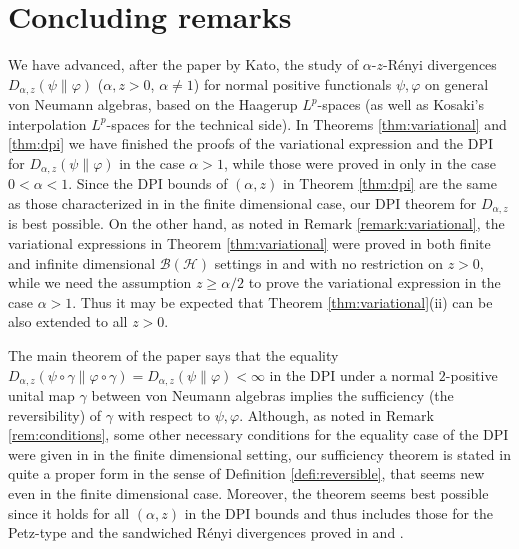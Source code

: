 \documentclass[12pt]{article}
\theoremstyle{definition}
\theoremstyle{remark}
\numberwithin{equation}{section}
\def\ffi{\varphi}
\begin{document}
\section{Concluding remarks}

We have advanced, after the paper \cite{kato2023onrenyi} by Kato, the study of $\alpha$-$z$-R\'enyi
divergences $D_{\alpha,z}(\psi\|\ffi)$ ($\alpha,z>0$, $\alpha\ne1$) for normal positive functionals $\psi,\ffi$
on general von Neumann algebras, based on the Haagerup $L^p$-spaces (as well as Kosaki's
interpolation $L^p$-spaces for the technical side). In Theorems \ref{thm:variational} and \ref{thm:dpi}
we have finished the proofs of the variational expression and the DPI for $D_{\alpha,z}(\psi\|\ffi)$ in the case
$\alpha>1$, while those were proved in \cite{kato2023onrenyi} only in the case $0<\alpha<1$. Since the
DPI bounds of $(\alpha,z)$ in Theorem \ref{thm:dpi} are the same as those characterized in
\cite{zhang2020fromwyd} in the finite dimensional case, our DPI theorem for $D_{\alpha,z}$ is best possible.
On the other hand, as noted in Remark \ref{remark:variational}, the variational expressions in Theorem
\ref{thm:variational} were proved in both finite and infinite dimensional $\mathcal{B}(\mathcal{H})$ settings
in \cite{zhang2020fromwyd} and \cite{mosonyi2023thestrong} with no restriction on $z>0$,
while we need the assumption $z\ge\alpha/2$ to prove the variational expression in the case
$\alpha>1$. Thus it may be expected that Theorem \ref{thm:variational}(ii) can be also extended
to all $z>0$.

The main theorem of the paper says that the equality
$D_{\alpha,z}(\psi\circ\gamma\|\ffi\circ\gamma)=D_{\alpha,z}(\psi\|\ffi)<\infty$ in the DPI under a normal
$2$-positive unital map $\gamma$ between von Neumann algebras implies the sufficiency (the reversibility)
of $\gamma$ with respect to $\psi,\ffi$. Although, as noted in Remark \ref{rem:conditions}, some
other necessary conditions for the equality case of the DPI were given in \cite{zhang2020equality}
in the finite dimensional setting, our sufficiency theorem is stated in quite a proper form in the sense
of Definition \ref{defi:reversible}, that seems new even in the finite dimensional case. Moreover,
the theorem seems best possible since it holds for all $(\alpha,z)$ in the DPI bounds and thus includes
those for the Petz-type and the sandwiched R\'enyi divergences proved in
\cite[Theorem 6.19]{hiai2021quantum} and \cite{jencova2018renyi,jencova2021renyi}.
\end{document}
